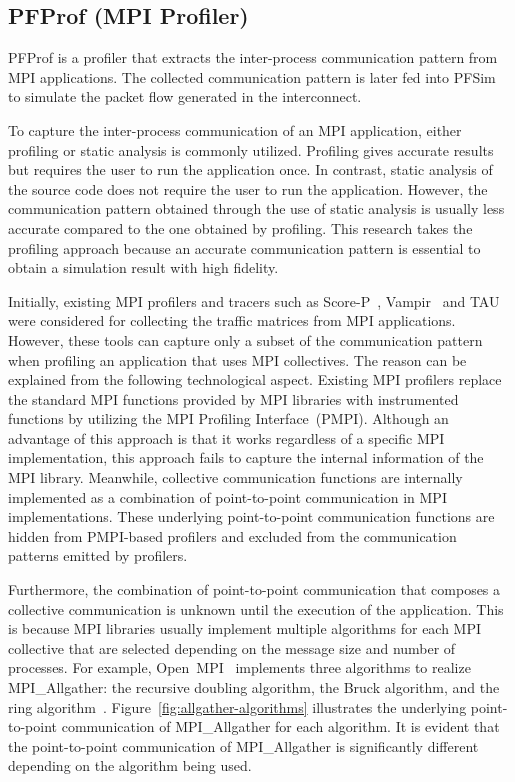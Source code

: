 \subsection{PFProf (MPI Profiler)}\label{sec:ii-pfprof}

PFProf is a profiler that extracts the inter-process communication pattern
from MPI applications. The collected communication pattern is later fed into
PFSim to simulate the packet flow generated in the interconnect.

To capture the inter-process communication of an MPI application, either
profiling or static analysis is commonly utilized. Profiling gives accurate
results but requires the user to run the application once. In contrast, static
analysis of the source code does not require the user to run the application.
However, the communication pattern obtained through the use of static analysis
is usually less accurate compared to the one obtained by profiling. This
research takes the profiling approach because an accurate communication
pattern is essential to obtain a simulation result with high fidelity.

Initially, existing MPI profilers and tracers such as
\mbox{Score-P}~\autocite{Knupfer2012}, Vampir~\autocite{Knupfer2008} and
TAU~\autocite{Shende2006} were considered for collecting the traffic matrices
from MPI applications. However, these tools can capture only a subset of the
communication pattern when profiling an application that uses MPI collectives.
The reason can be explained from the following technological aspect. Existing
MPI profilers replace the standard MPI functions provided by MPI libraries
with instrumented functions by utilizing the MPI Profiling Interface~(PMPI).
Although an advantage of this approach is that it works regardless of a
specific MPI implementation, this approach fails to capture the internal
information of the MPI library. Meanwhile, collective communication functions
are internally implemented as a combination of point-to-point communication in
MPI implementations. These underlying point-to-point communication functions
are hidden from PMPI-based profilers and excluded from the communication
patterns emitted by profilers.

Furthermore, the combination of point-to-point communication that composes a
collective communication is unknown until the execution of the application.
This is because MPI libraries usually implement multiple algorithms for each
MPI collective that are selected depending on the message size and number of
processes. For example, Open~MPI~\cite{Gabriel2004} implements three
algorithms to realize MPI\_Allgather: the recursive doubling algorithm, the
Bruck algorithm, and the ring algorithm~\cite{Rabenseifner2004}.
Figure~\ref{fig:allgather-algorithms} illustrates the underlying point-to-point
communication of MPI\_Allgather for each algorithm. It is evident that the
point-to-point communication of MPI\_Allgather is significantly different
depending on the algorithm being used.

